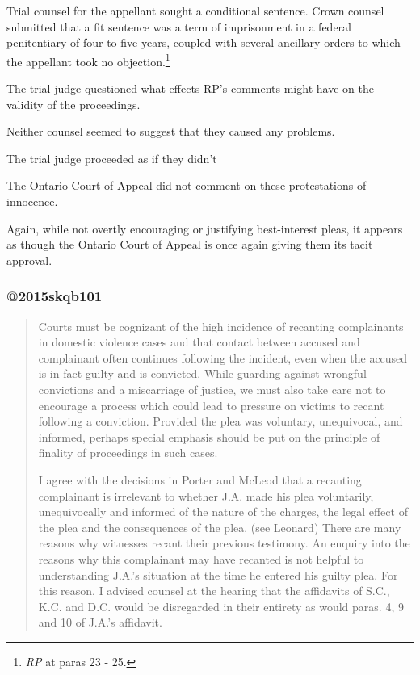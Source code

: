 Trial counsel for the appellant sought a conditional sentence. Crown counsel submitted that a fit sentence was a term of imprisonment in a federal penitentiary of four to five years, coupled with several ancillary orders to which the appellant took no objection.\footnote{\textit{RP} at paras 23 - 25.}

The trial judge questioned what effects RP's comments might have on the validity of the proceedings.

Neither counsel seemed to suggest that they caused any problems.

The trial judge proceeded as if they didn't

The Ontario Court of Appeal did not comment on these protestations of innocence.

Again, while not overtly encouraging or justifying best-interest pleas, it appears as though the Ontario Court of Appeal is once again giving them its tacit approval.

\subsubsection{@2015skqb101}

\begin{quote}
    Courts must be cognizant of the high incidence of recanting complainants in domestic violence cases and that contact between accused and complainant often continues following the incident, even when the accused is in fact guilty and is convicted. While guarding against wrongful convictions and a miscarriage of justice, we must also take care not to encourage a process which could lead to pressure on victims to recant following a conviction. Provided the plea was voluntary, unequivocal, and informed, perhaps special emphasis should be put on the principle of finality of proceedings in such cases.
    
    I agree with the decisions in Porter and McLeod that a recanting complainant is irrelevant to whether J.A. made his plea voluntarily, unequivocally and informed of the nature of the charges, the legal effect of the plea and the consequences of the plea. (see Leonard) There are many reasons why witnesses recant their previous testimony. An enquiry into the reasons why this complainant may have recanted is not helpful to understanding J.A.'s situation at the time he entered his guilty plea. For this reason, I advised counsel at the hearing that the affidavits of S.C., K.C. and D.C. would be disregarded in their entirety as would paras. 4, 9 and 10 of J.A.'s affidavit.
\end{quote}

